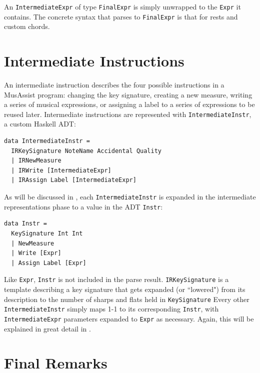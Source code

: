\documentclass{report}
\begin{document}
An \verb.IntermediateExpr. of type \verb.FinalExpr. is simply unwrapped to the \verb.Expr. it contains. The concrete syntax that parses to \verb.FinalExpr. is that for rests and custom chords. 

\section{Intermediate Instructions}

An intermediate instruction describes the four possible instructions in a MusAssist program: changing the key signature, creating a new measure, writing a series of musical expressions, or assigning a label to a series of expressions to be reused later. Intermediate instructions are represented with \verb.IntermediateInstr., a custom Haskell ADT:

\begin{verbatim}
data IntermediateInstr = 
  IRKeySignature NoteName Accidental Quality
  | IRNewMeasure
  | IRWrite [IntermediateExpr]
  | IRAssign Label [IntermediateExpr]
\end{verbatim}

As will be discussed in , each \verb.IntermediateInstr. is expanded in the intermediate representations phase to a value in the ADT \verb.Instr.:

\begin{verbatim}
data Instr = 
  KeySignature Int Int 
  | NewMeasure 
  | Write [Expr]
  | Assign Label [Expr] 
\end{verbatim}

Like \verb.Expr., \verb.Instr. is not included in the parse result. \verb.IRKeySignature. is a template describing a key signature that gets expanded (or ``lowered") from its description to the number of sharps and flats held in \verb.KeySignature. Every other \verb.IntermediateInstr. simply maps 1-1 to its corresponding \verb.Instr., with \verb.IntermediateExpr. parameters expanded to \verb.Expr. as necessary. Again, this will be explained in great detail in .

\section{Final Remarks}
\label{sec:finalremarks}
\end{document}
